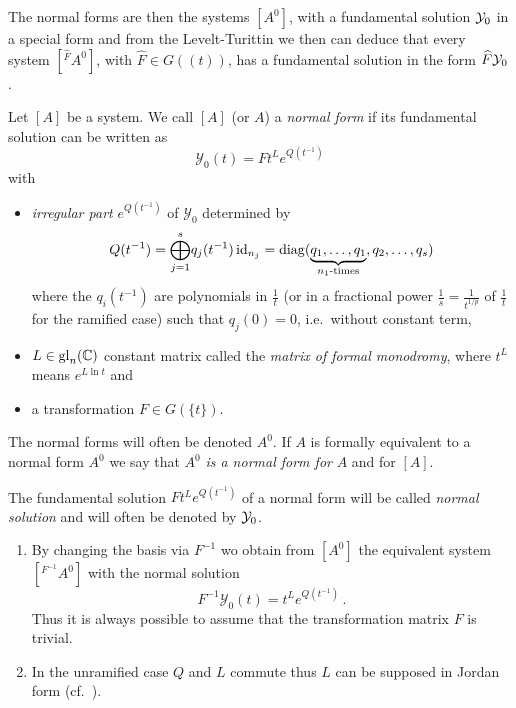 The normal forms are then the systems $[A^0]$, with a fundamental solution
$\mathcal{Y}_0$ in a special form and from the Levelt-Turittin we then can deduce that
every system $[{}^{\hat F}\!A^0]$, with $\hat F\in G(\!(t)\!)$, has a
fundamental solution in the form $\widehat F\mathcal{Y}_0$.
\begin{defn}\label{defn:normSol}
  Let $[A]$ be a system.
  We call $[A]$ (or $A$) a \emph{normal form} if its fundamental solution can
  be written as
  \[
    \mathcal{Y}_0(t)=F t^L e^{Q(t^{-1})}
  \]
  with
  \begin{itemize}
    \item \emph{irregular part} $e^{Q(t^{-1})}$ of $\mathcal{Y}_0$ determined
      by
      \[
        Q(t^{-1})=\underset{j=1}{\overset{s}{\bigoplus}}q_j(t^{-1})\id_{n_j}
          =\diag(\underset{n_1\text{-times}}{\underbrace{%
          q_1,\dots,q_1}},q_2,\dots,q_s)
      \]
      where the $q_i(t^{-1})$ are polynomials in $\frac{1}{t}$ (or in a
      fractional power $\frac{1}{s}=\frac{1}{t^{1/p}}$ of $\frac{1}{t}$ for the
      ramified case) such that $q_j(0)=0$, i.e.\ without constant term,
    \item $L\in\operatorname{gl}_n(\mathbb{C})$ constant
      matrix called the \emph{matrix of formal
      monodromy}, where $t^L$ means $e^{L\ln t}$ and
    \item a transformation $F\in G(\!\{t\}\!)$.
  \end{itemize}
  The normal forms will often be denoted $A^0$.
  If $A$ is formally equivalent to a normal form $A^0$ we say that $A^0$
  \emph{is a normal form for} $A$ and for $[A]$.

  The fundamental solution $F t^L e^{Q(t^{-1})}$ of a normal form will be
  called \emph{normal solution} and will often be denoted by $\mathcal{Y}_0$.
  \begin{s-rem}
    \begin{enumerate}
      \item {} By changing the
        basis via $F^{-1}$ wo obtain from $[A^0]$ the equivalent system
        $[{}^{F^{-1}}\!A^0]$ with the normal solution
      \[
        F^{-1}\mathcal{Y}_0(t)=t^L e^{Q(t^{-1})} \,.
      \]
      Thus it is always possible to assume that the transformation matrix $F$ is
      trivial.
      \item In the unramified case $Q$ and $L$ commute thus $L$ can be supposed
        in Jordan form (cf.\ \cite[Sec.4]{Martinet1991}).
    \end{enumerate}
  \end{s-rem}
  \begin{comment}
    \begin{s-rem}
      The system $[A^0]$ has the same monodromy as $t^L$. \comm{In fact, every
      formally equivalent system has the same monodromy.}
    \end{s-rem}
  \end{comment}
\end{defn}
